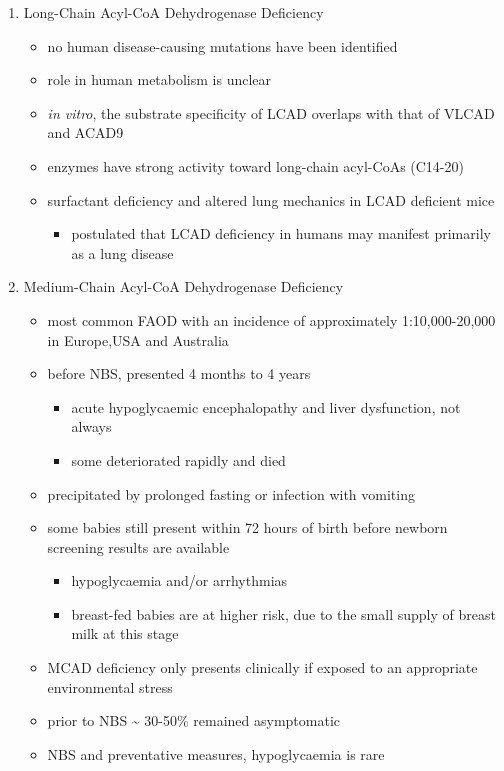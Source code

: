 \documentclass{scrartcl}
\begin{document}
\begin{enumerate}
\item Long-Chain Acyl-CoA Dehydrogenase Deficiency
\label{sec:org5117b3d}
\begin{itemize}
\item no human disease-causing mutations have been identified
\item role  in  human  metabolism  is unclear
\item \emph{in vitro}, the substrate specificity of LCAD overlaps with that of
VLCAD and ACAD9
\item enzymes have strong activity toward long-chain acyl-CoAs (C14-20)
\item surfactant deficiency and altered lung mechanics in LCAD deficient
mice
\begin{itemize}
\item postulated that LCAD deficiency in humans may manifest primarily
as a lung disease
\end{itemize}
\end{itemize}
\item Medium-Chain Acyl-CoA Dehydrogenase Deficiency
\label{sec:org52a6489}
\begin{itemize}
\item most common FAOD with an incidence of approximately 1:10,000-20,000
in Europe,USA and Australia
\item before NBS, presented 4 months to 4 years
\begin{itemize}
\item acute hypoglycaemic encephalopathy and liver dysfunction, not always
\item some deteriorated rapidly and died
\end{itemize}
\item precipitated by prolonged fasting or infection with vomiting
\item some babies still present within 72 hours of birth before
newborn screening results are available
\begin{itemize}
\item hypoglycaemia and/or arrhythmias
\item breast-fed babies are at higher risk, due to the small supply of
breast milk at this stage
\end{itemize}
\item MCAD deficiency only presents clinically if exposed to an
appropriate environmental stress
\item prior to NBS \textasciitilde{} 30-50\% remained asymptomatic
\item NBS and preventative measures, hypoglycaemia is rare

\end{itemize}
\end{enumerate}
\end{document}
